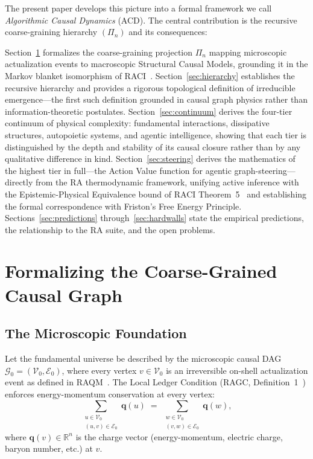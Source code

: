 \documentclass[11pt,a4paper]{article}
\theoremstyle{remark}
\newcommand{\GG}{\mathcal{G}}
\newcommand{\VV}{\mathcal{V}}
\newcommand{\EE}{\mathcal{E}}
\begin{document}
The present paper develops this picture into a formal framework we call
\emph{Algorithmic Causal Dynamics} (ACD). The central contribution is the
recursive coarse-graining hierarchy $(\Pi_n)$ and its consequences:

Section~\ref{sec:coarsegrain} formalizes the coarse-graining projection $\Pi_n$
mapping microscopic actualization events to macroscopic Structural Causal Models,
grounding it in the Markov blanket isomorphism of RACI~\citep{Sandeman2026c}.
Section~\ref{sec:hierarchy} establishes the recursive hierarchy and provides a
rigorous topological definition of irreducible emergence---the first such
definition grounded in causal graph physics rather than information-theoretic
postulates. Section~\ref{sec:continuum} derives the four-tier continuum of
physical complexity: fundamental interactions, dissipative structures, autopoietic
systems, and agentic intelligence, showing that each tier is distinguished by the
depth and stability of its causal closure rather than by any qualitative difference
in kind. Section~\ref{sec:steering} derives the mathematics of the highest tier
in full---the Action Value function for agentic graph-steering---directly from
the RA thermodynamic framework, unifying active inference with the Epistemic-Physical
Equivalence bound of RACI Theorem~5~\citep{Sandeman2026c} and establishing the
formal correspondence with Friston's Free Energy Principle. Sections~\ref{sec:predictions}
through~\ref{sec:hardwalls} state the empirical predictions, the relationship to
the RA suite, and the open problems.

\section{Formalizing the Coarse-Grained Causal Graph}
\label{sec:coarsegrain}

\subsection{The Microscopic Foundation}

Let the fundamental universe be described by the microscopic causal DAG
$\GG_0 = (\VV_0, \EE_0)$, where every vertex $v \in \VV_0$ is an irreversible
on-shell actualization event as defined in RAQM~\citep{Sandeman2026a}. The Local
Ledger Condition (RAGC, Definition~1~\citep{Sandeman2026b}) enforces
energy-momentum conservation at every vertex:
\begin{equation}
  \sum_{\substack{u \in \VV_0 \\ (u,v)\in\EE_0}} \mathbf{q}(u)
  \;=\;
  \sum_{\substack{w \in \VV_0 \\ (v,w)\in\EE_0}} \mathbf{q}(w),
\end{equation}
where $\mathbf{q}(v) \in \mathbb{R}^n$ is the charge vector (energy-momentum,
electric charge, baryon number, etc.) at $v$.
\end{document}
